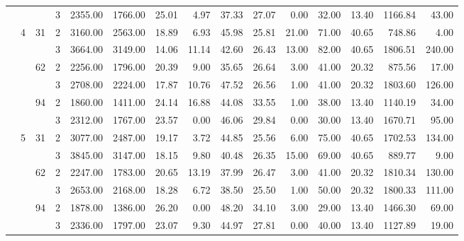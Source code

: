 \begin{tabular}{llllrrrrrrrrrrr}
                &   &    & 3 &  2355.00 &   1766.00 & 25.01 &    4.97 &   37.33 &   27.07 &    0.00 &   32.00 &   13.40 & 1166.84 &    43.00 \\
\cline{2-15}
\cline{3-15}
                & \multirow{6}{*}{4} & \multirow{2}{*}{31} & 2 &  3160.00 &   2563.00 & 18.89 &    6.93 &   45.98 &   25.81 &   21.00 &   71.00 &   40.65 &  748.86 &     4.00 \\
                &   &    & 3 &  3664.00 &   3149.00 & 14.06 &   11.14 &   42.60 &   26.43 &   13.00 &   82.00 &   40.65 & 1806.51 &   240.00 \\
\cline{3-15}
                &   & \multirow{2}{*}{62} & 2 &  2256.00 &   1796.00 & 20.39 &    9.00 &   35.65 &   26.64 &    3.00 &   41.00 &   20.32 &  875.56 &    17.00 \\
                &   &    & 3 &  2708.00 &   2224.00 & 17.87 &   10.76 &   47.52 &   26.56 &    1.00 &   41.00 &   20.32 & 1803.60 &   126.00 \\
\cline{3-15}
                &   & \multirow{2}{*}{94} & 2 &  1860.00 &   1411.00 & 24.14 &   16.88 &   44.08 &   33.55 &    1.00 &   38.00 &   13.40 & 1140.19 &    34.00 \\
                &   &    & 3 &  2312.00 &   1767.00 & 23.57 &    0.00 &   46.06 &   29.84 &    0.00 &   30.00 &   13.40 & 1670.71 &    95.00 \\
\cline{2-15}
\cline{3-15}
                & \multirow{6}{*}{5} & \multirow{2}{*}{31} & 2 &  3077.00 &   2487.00 & 19.17 &    3.72 &   44.85 &   25.56 &    6.00 &   75.00 &   40.65 & 1702.53 &   134.00 \\
                &   &    & 3 &  3845.00 &   3147.00 & 18.15 &    9.80 &   40.48 &   26.35 &   15.00 &   69.00 &   40.65 &  889.77 &     9.00 \\
\cline{3-15}
                &   & \multirow{2}{*}{62} & 2 &  2247.00 &   1783.00 & 20.65 &   13.19 &   37.99 &   26.47 &    3.00 &   41.00 &   20.32 & 1810.34 &   130.00 \\
                &   &    & 3 &  2653.00 &   2168.00 & 18.28 &    6.72 &   38.50 &   25.50 &    1.00 &   50.00 &   20.32 & 1800.33 &   111.00 \\
\cline{3-15}
                &   & \multirow{2}{*}{94} & 2 &  1878.00 &   1386.00 & 26.20 &    0.00 &   48.20 &   34.10 &    3.00 &   29.00 &   13.40 & 1466.30 &    69.00 \\
                &   &    & 3 &  2336.00 &   1797.00 & 23.07 &    9.30 &   44.97 &   27.81 &    0.00 &   40.00 &   13.40 & 1127.89 &    19.00 \\

\end{tabular}
